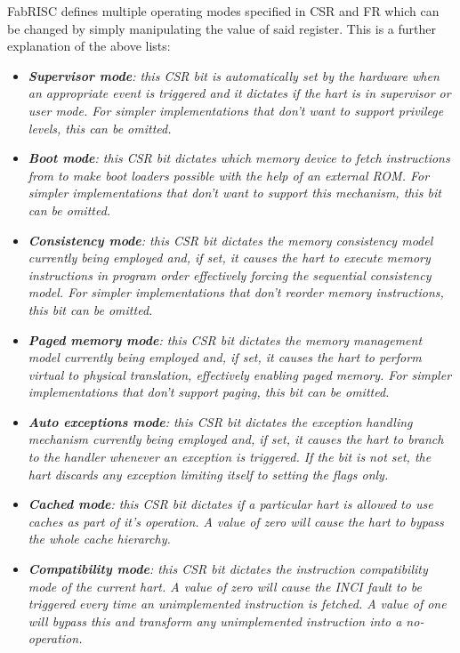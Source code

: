 \documentclass{article}
\begin{document}
                \vspace{10pt}

                FabRISC defines multiple operating modes specified in CSR and FR which can be changed by simply manipulating the value of said register. This is a further explanation of the above lists:

                \begin{itemize}

                    \item \textit{\textbf{Supervisor mode}: this CSR bit is automatically set by the hardware when an appropriate event is triggered and it dictates if the hart is in supervisor or user mode. For simpler implementations that don't want to support privilege levels, this can be omitted.}

                    \item \textit{\textbf{Boot mode}: this CSR bit dictates which memory device to fetch instructions from to make boot loaders possible with the help of an external ROM. For simpler implementations that don't want to support this mechanism, this bit can be omitted.}

                    \item \textit{\textbf{Consistency mode}: this CSR bit dictates the memory consistency model currently being employed and, if set, it causes the hart to execute memory instructions in program order effectively forcing the sequential consistency model. For simpler implementations that don't reorder memory instructions, this bit can be omitted.}

                    \item \textit{\textbf{Paged memory mode}: this CSR bit dictates the memory management model currently being employed and, if set, it causes the hart to perform virtual to physical translation, effectively enabling paged memory. For simpler implementations that don't support paging, this bit can be omitted.}

                    \item \textit{\textbf{Auto exceptions mode}: this CSR bit dictates the exception handling mechanism currently being employed and, if set, it causes the hart to branch to the handler whenever an exception is triggered. If the bit is not set, the hart discards any exception limiting itself to setting the flags only.}

                    \item \textit{\textbf{Cached mode}: this CSR bit dictates if a particular hart is allowed to use caches as part of it's operation. A value of zero will cause the hart to bypass the whole cache hierarchy.}

                    \item \textit{\textbf{Compatibility mode}: this CSR bit dictates the instruction compatibility mode of the current hart. A value of zero will cause the INCI fault to be triggered every time an unimplemented instruction is fetched. A value of one will bypass this and transform any unimplemented instruction into a no-operation.}

                \end{itemize}
\end{document}
